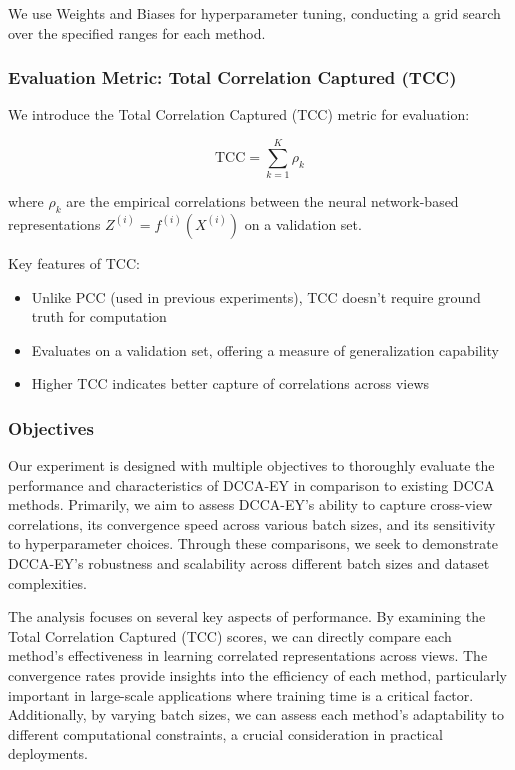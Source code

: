 We use Weights and Biases \citep{wandb} for hyperparameter tuning, conducting a grid search over the specified ranges for each method.

\subsubsection{Evaluation Metric: Total Correlation Captured (TCC)}
We introduce the Total Correlation Captured (TCC) metric for evaluation:

\[
    \text{TCC} = \sum_{k=1}^K \rho_k
\]

where $\rho_k$ are the empirical correlations between the neural network-based representations $Z^{(i)} = f^{(i)}(X^{(i)})$ on a validation set.

Key features of TCC:
\begin{itemize}
    \item Unlike PCC (used in previous experiments), TCC doesn't require ground truth for computation
    \item Evaluates on a validation set, offering a measure of generalization capability
    \item Higher TCC indicates better capture of correlations across views
\end{itemize}

\subsubsection{Objectives}

Our experiment is designed with multiple objectives to thoroughly evaluate the performance and characteristics of DCCA-EY in comparison to existing DCCA methods. Primarily, we aim to assess DCCA-EY's ability to capture cross-view correlations, its convergence speed across various batch sizes, and its sensitivity to hyperparameter choices. Through these comparisons, we seek to demonstrate DCCA-EY's robustness and scalability across different batch sizes and dataset complexities.

The analysis focuses on several key aspects of performance. By examining the Total Correlation Captured (TCC) scores, we can directly compare each method's effectiveness in learning correlated representations across views. The convergence rates provide insights into the efficiency of each method, particularly important in large-scale applications where training time is a critical factor. Additionally, by varying batch sizes, we can assess each method's adaptability to different computational constraints, a crucial consideration in practical deployments.

